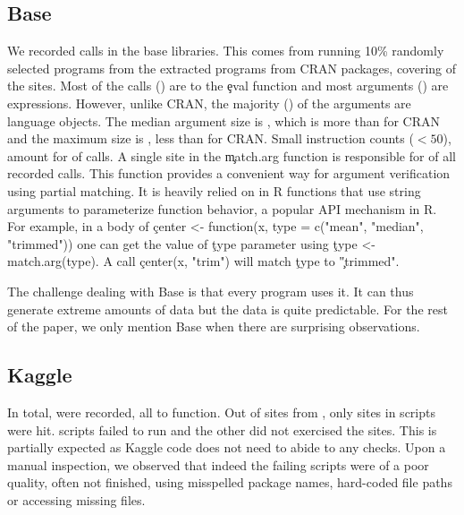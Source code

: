 \documentclass[review,screen,acmsmall,anonymous=true]{acmart}
\begin{document}
\subsection{Base}

We recorded \baseAllcalls \eval calls in the \BasePackages base libraries. This
comes from running 10\% randomly selected programs from the
\CranRunnableScriptsRnd extracted programs from CRAN packages, covering
\baseTriggeredevalpct of the \BaseEvalCallSites sites. Most of the calls
(\baseEvalsratio) are to the \c{eval} function and most arguments
(\baseCodepercent) are expressions. However, unlike CRAN, the majority
(\baseLanguagepercent) of the arguments are language objects. The median
argument size is \baseMedianszeval, which is more than for CRAN and the maximum
size is \baseMaxszeval, less than for CRAN. Small instruction counts ($<50$),
amount for \baseSmalleventspct of calls. A single site in the \c{match.arg}
function is responsible for \baseTopFuncPercent of all recorded calls. This
function provides a convenient way for argument verification using partial
matching. It is heavily relied on in R functions that use string arguments to
parameterize function behavior, a popular API mechanism in R. For example, in a
body of \c{center <- function(x, type = c("mean", "median", "trimmed"))} one
can get the value of \c{type} parameter using \c{type <- match.arg(type)}. A
call \c{center(x, "trim")} will match \c{type} to \c{"trimmed"}.

The challenge dealing with Base is that every program uses it. It can thus
generate extreme amounts of data but the data is quite predictable. For the
rest of the paper, we only mention Base when there are surprising
observations.

\medskip

\subsection{Kaggle}

In total, \kaggleAllcalls \eval were recorded, all to \eval function. Out of
\kaggleStaticeval sites from \KaggleWithEvals, only \kaggleTriggeredeval sites
in \kaggleNbruns scripts were hit. \KaggleFailedScripts scripts failed to run
and the other did not exercised the \eval sites. This is partially expected
as Kaggle code does not need to abide to any checks. Upon a manual inspection,
we observed that indeed the failing scripts were of a poor quality, often not
finished, using misspelled package names, hard-coded file paths or accessing
missing files.
\end{document}
